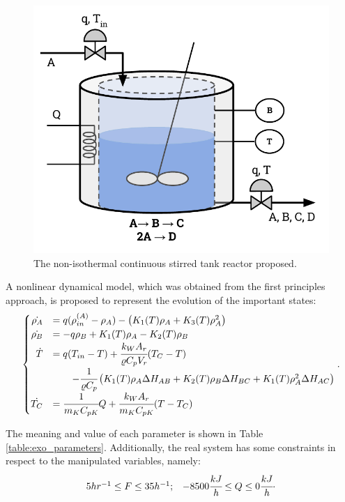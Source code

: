 \documentclass[a4paper,11pt]{book}
\numberwithin{figure}{chapter}
\numberwithin{equation}{chapter}
\numberwithin{table}{chapter}
\theoremstyle{definition}
\begin{document}
\begin{figure}[ht] \centering
	\includegraphics[scale=0.75]{chapter6/exoCSTR}
	\caption{The non-isothermal continuous stirred tank reactor proposed.}
	\label{fig:methodology01}
\end{figure}

A nonlinear dynamical model, which was obtained from the first principles approach, is proposed to represent the evolution of the important states:
\begin{align} \label{eq:engellModel}
\begin{cases}
	\hfill \dot{\rho_A} &= q (\rho^{(A)}_{in} - \rho_A) - \left( K_1(T) \rho_A + K_3(T) \rho^2_A  \right) \\
	\hfill \dot{\rho_B} &= - q \rho_B + K_1(T) \rho_A - K_2(T) \rho_B \\
	\hfill \dot{T} &= q(T_{in} - T) + \cfrac{k_W A_r}{\varrho C_p V_r} (T_C - T) \\ & \ \ \ \ \ \ -\cfrac{1}{\varrho C_p} \left( K_1(T) \rho_A \Delta H_{AB} + K_2(T) \rho_B \Delta H_{BC} + K_1(T) \rho_A^2 \Delta H_{AC} \right) \\
	\hfill \dot{T_C} &= \cfrac{1}{m_K C_{pK}} Q + \cfrac{k_W A_r}{m_K C_{pK}} (T - T_C) 
\end{cases}
.\end{align}

The meaning and value of each parameter is shown in Table \ref{table:exo_parameters}. Additionally, the real system has some constraints in respect to the manipulated variables, namely:
\begin{equation}
\begin{matrix}
	5 hr^{-1} \leq F \leq 35 h^{-1}; & -8500 \cfrac{kJ}{h} \leq Q \leq 0 \cfrac{kJ}{h}
\end{matrix}
.\end{equation}
\end{document}
